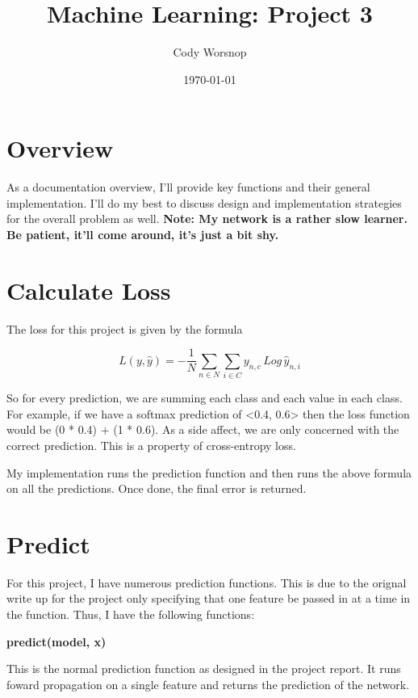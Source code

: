 \documentclass{article}
\title{Machine Learning: Project 3}
\author{Cody Worsnop}
\date{\today}
\begin{document}
\maketitle 

\section*{Overview} %

As a documentation overview, I'll provide key functions and their general implementation. I'll do my best to discuss design and implementation strategies for the overall problem as well. 
\newline
\newline
\bf Note: \rm
My network is a rather slow learner. Be patient, it'll come around, it's just a bit shy. 

\section*{Calculate Loss} %

The loss for this project is given by the formula 

\begin{equation}
L(y, \hat{y}) = -\frac{1}{N}\sum_{n\in{N}}\sum_{i\in{C}}y_{n,c}\,Log\,\hat{y}_{n,i}
\end{equation}

So for every prediction, we are summing each class and each value in each class. For example, if we have a softmax prediction of <0.4, 0.6> then the loss function would be (0 * 0.4) + (1 * 0.6). As a side affect, we are only concerned with the correct prediction. This is a property of cross-entropy loss. 

My implementation runs the prediction function and then runs the above formula on all the predictions. Once done, the final error is returned. 

\section*{Predict} 

For this project, I have numerous prediction functions. This is due to the orignal write up for the project only specifying that one feature be passed in at a time in the function. Thus, I have the following functions: 

\textbf{predict(model, x)}

This is the normal prediction function as designed in the project report. It runs foward propagation on a single feature and returns the prediction of the network. 
\end{document}
